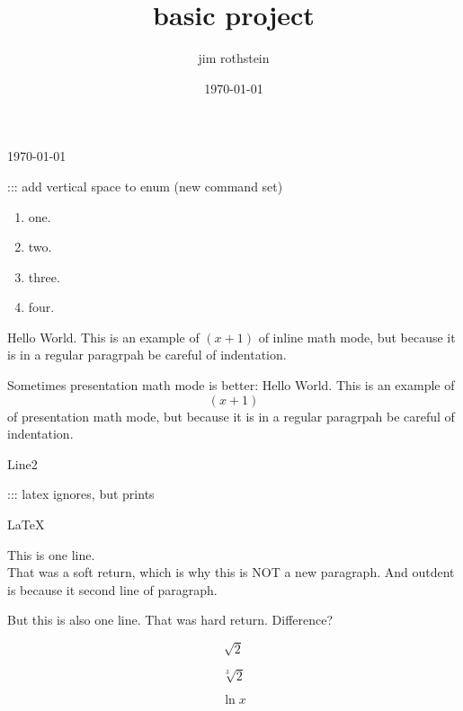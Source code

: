 \documentclass{article}
\title{basic project}
\author{jim rothstein}
\date{\today}
\newcommand{\set}[1]{\setlength\itemsep{#1em}}
\begin{document}
\maketitle
\today

:::		add vertical space to enum (new command set)
\begin{enumerate}
\item one.
\set{6}
\item two.
\item three.
\set{1}
\item four.
\end{enumerate}


\begin{center}
    Hello World.  This is an example of $(x+1)$ of inline math mode, but
    because it is in a regular paragrpah be careful of indentation.


    Sometimes presentation math mode is better:  
    Hello World.  This is an example of $$(x+1)$$ of presentation math mode, but
    because it is in a regular paragrpah be careful of indentation.

Line2

\end{center}


::: latex ignores, but prints

\LaTeX\


This is one line.  \\
That was a soft return, which is  why this is NOT a new paragraph. And outdent
is because it second line of paragraph.


But this is also one line.
That was hard return.  Difference?


\begin{center}
$$\sqrt{2}$$

$$\sqrt[3]{2}$$

$$\ln x$$

        


\end{center}
\end{document}
